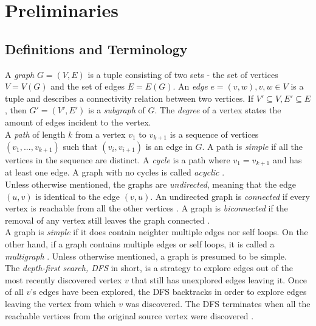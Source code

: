 \section{Preliminaries}\label{section:preliminaries}

\subsection{Definitions and Terminology}
A \emph{graph} $G=(V,E)$ is a tuple consisting of two sets - the set of vertices $V=V(G)$ and the set of edges $E=E(G)$. An \emph{edge} $e = (v,w), v,w \in V$ is a tuple and describes a connectivity relation between two vertices.
If $V'\subseteq V, E'\subseteq E$, then $G' = (V',E')$ is a \emph{subgraph} of $G$.
The \emph{degree} of a vertex states the amount of edges incident to the vertex.\\
A \emph{path} of length $k$ from a vertex $v_1$ to $v_{k+1}$ is a sequence of vertices $(v_1,...,v_{k+1})$ such that $(v_i,v_{i+1})$ is an edge in $G$.  A path is \emph{simple} if all the vertices in the sequence are distinct. A \emph{cycle} is a path where $v_1 = v_{k+1}$ and has at least one edge. A graph with no cycles is called \emph{acyclic} \cite[P. 1170]{DBLP:cormen_intro_to_algorithms}.\\
Unless otherwise mentioned, the graphs are \emph{undirected}, meaning that the edge $(u,v)$ is identical to the edge $(v,u)$.
An undirected graph is \emph{connected} if every vertex is reachable from all the other vertices \cite[P. 1170]{DBLP:cormen_intro_to_algorithms}.
A graph is \emph{biconnected} if the removal of any vertex still leaves the graph connected \cite[P. 224]{Duncan_planar_polyline_drawings}.\\
A graph is \emph{simple} if it does contain neighter multiple edges nor self loops. On the other hand, if a graph contains multiple edges or self loops, it is called a \emph{multigraph} \cite[P. 1172]{DBLP:cormen_intro_to_algorithms}. Unless otherwise mentioned, a graph is presumed to be simple.\\
The \emph{depth-first search, DFS} in short, is a strategy to explore edges out of the most recently discovered vertex $v$ that still has unexplored edges leaving it. Once of all $v$'s edges have been explored, the DFS backtracks in order to explore edges leaving the vertex from which $v$ was discovered. The DFS terminates when all the reachable vertices from the original source vertex were discovered \cite[P.603]{DBLP:cormen_intro_to_algorithms}.


